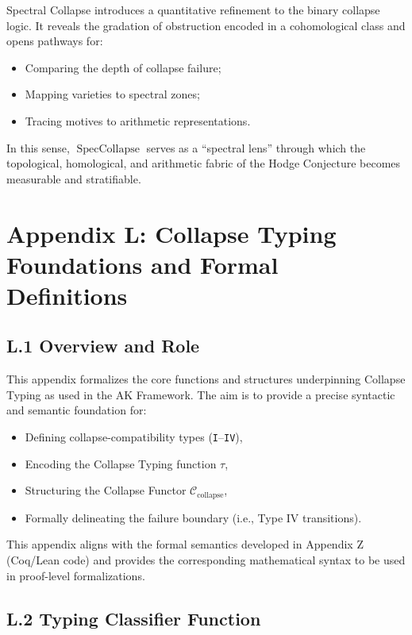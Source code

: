 \documentclass[11pt]{article}
\begin{document}
Spectral Collapse introduces a quantitative refinement to the binary collapse logic. It reveals the gradation of obstruction encoded in a cohomological class and opens pathways for:

\begin{itemize}
  \item Comparing the depth of collapse failure;
  \item Mapping varieties to spectral zones;
  \item Tracing motives to arithmetic representations.
\end{itemize}

In this sense, $\operatorname{SpecCollapse}$ serves as a “spectral lens” through which the topological, homological, and arithmetic fabric of the Hodge Conjecture becomes measurable and stratifiable.



\section*{Appendix L: Collapse Typing Foundations and Formal Definitions}

\subsection*{L.1 Overview and Role}

This appendix formalizes the core functions and structures underpinning Collapse Typing as used in the AK Framework.  
The aim is to provide a precise syntactic and semantic foundation for:

\begin{itemize}
  \item Defining collapse-compatibility types (\texttt{I}–\texttt{IV}),
  \item Encoding the Collapse Typing function $\tau$,
  \item Structuring the Collapse Functor $\mathcal{C}_{\text{collapse}}$,
  \item Formally delineating the failure boundary (i.e., Type IV transitions).
\end{itemize}

This appendix aligns with the formal semantics developed in Appendix Z (Coq/Lean code) and provides the corresponding mathematical syntax to be used in proof-level formalizations.

\subsection*{L.2 Typing Classifier Function}
\end{document}
